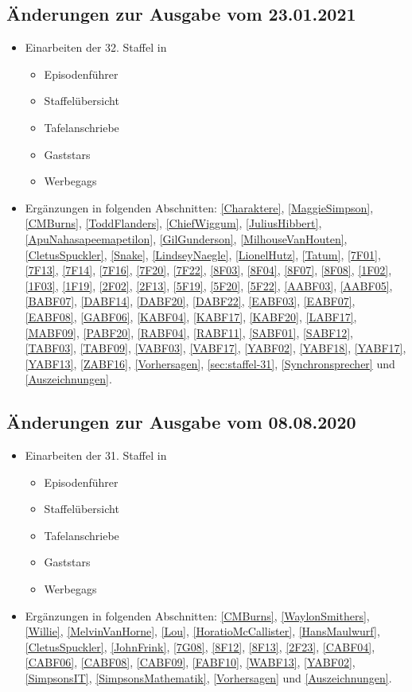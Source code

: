 \documentclass[pagesize,twoside,german]{scrbook}
\begin{document}
\subsection*{Änderungen zur Ausgabe vom 23.01.2021}
\begin{itemize}
	\item Einarbeiten der 32. Staffel in
	\begin{itemize}
		\item Episodenführer
		\item Staffelübersicht
		\item Tafelanschriebe
		\item Gaststars
		\item Werbegags
	\end{itemize}
	\item Ergänzungen in folgenden Abschnitten: \ref{Charaktere}, \ref{MaggieSimpson}, \ref{CMBurns}, \ref{ToddFlanders}, \ref{ChiefWiggum}, \ref{JuliusHibbert}, \ref{ApuNahasapeemapetilon}, \ref{GilGunderson}, \ref{MilhouseVanHouten}, \ref{CletusSpuckler}, \ref{Snake}, \ref{LindseyNaegle}, \ref{LionelHutz}, \ref{Tatum}, \ref{7F01}, \ref{7F13}, \ref{7F14}, \ref{7F16}, \ref{7F20}, \ref{7F22}, \ref{8F03}, \ref{8F04}, \ref{8F07}, \ref{8F08}, \ref{1F02}, \ref{1F03}, \ref{1F19}, \ref{2F02}, \ref{2F13}, \ref{5F19}, \ref{5F20}, \ref{5F22}, \ref{AABF03}, \ref{AABF05}, \ref{BABF07}, \ref{DABF14}, \ref{DABF20}, \ref{DABF22}, \ref{EABF03}, \ref{EABF07}, \ref{EABF08}, \ref{GABF06}, \ref{KABF04}, \ref{KABF17}, \ref{KABF20}, \ref{LABF17}, \ref{MABF09}, \ref{PABF20}, \ref{RABF04}, \ref{RABF11}, \ref{SABF01}, \ref{SABF12}, \ref{TABF03}, \ref{TABF09}, \ref{VABF03}, \ref{VABF17}, \ref{YABF02}, \ref{YABF18}, \ref{YABF17}, \ref{YABF13}, \ref{ZABF16}, \ref{Vorhersagen}, \ref{sec:staffel-31}, \ref{Synchronsprecher} und \ref{Auszeichnungen}.
\end{itemize}

\subsection*{Änderungen zur Ausgabe vom 08.08.2020}
\begin{itemize}
	\item Einarbeiten der 31. Staffel in
	\begin{itemize}
		\item Episodenführer
		\item Staffelübersicht
		\item Tafelanschriebe
		\item Gaststars
		\item Werbegags
	\end{itemize}
	\item Ergänzungen in folgenden Abschnitten: \ref{CMBurns}, \ref{WaylonSmithers}, \ref{Willie}, \ref{MelvinVanHorne}, \ref{Lou}, \ref{HoratioMcCallister}, \ref{HansMaulwurf}, \ref{CletusSpuckler}, \ref{JohnFrink}, \ref{7G08}, \ref{8F12}, \ref{8F13}, \ref{2F23}, \ref{CABF04}, \ref{CABF06}, \ref{CABF08}, \ref{CABF09}, \ref{FABF10}, \ref{WABF13}, \ref{YABF02}, \ref{SimpsonsIT}, \ref{SimpsonsMathematik}, \ref{Vorhersagen} und \ref{Auszeichnungen}.
\end{itemize}
\end{document}
